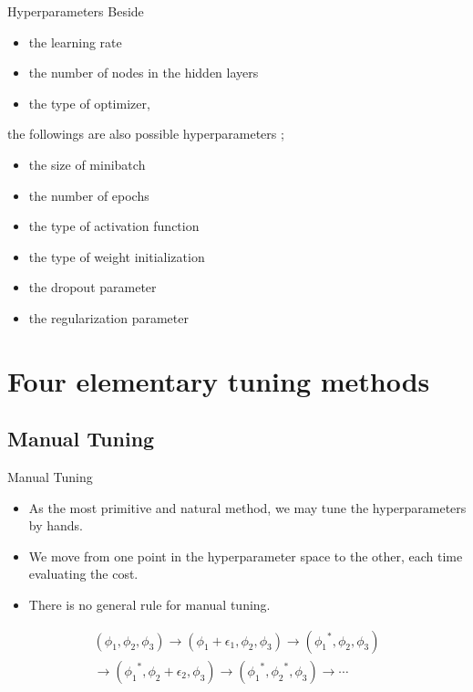 \documentclass{beamer}
\begin{document}
%
\begin{frame}{Hyperparameters}
Beside
\begin{itemize}
\setlength\itemsep{0pt}
\item
the learning rate
\item
the number of nodes in the hidden layers
\item
the type of optimizer,
\end{itemize}
the followings are also possible hyperparameters ; 
\begin{itemize}
\setlength\itemsep{0pt}
\item
the size of minibatch
\item
the number of epochs
\item
the type of activation function
\item
the type of weight initialization
\item
the dropout parameter
\item
the regularization parameter
\end{itemize}
\end{frame}

\section{Four elementary tuning methods}

\subsection{Manual Tuning}

%
\begin{frame}{Manual Tuning}
\begin{itemize}
\item
As the most primitive and natural method, we may tune the hyperparameters by hands.
\item
We move from one point in the hyperparameter space to the other, each time evaluating the cost.
\item
There is no general rule for manual tuning.
\end{itemize}
\begin{multline*}
(\phi_1,\phi_2,\phi_3)
\longrightarrow(\phi_1+\epsilon_1,\phi_2,\phi_3)
\longrightarrow({\phi_1}^*,\phi_2,\phi_3)\\
\longrightarrow({\phi_1}^*,\phi_2+\epsilon_2,\phi_3)
\longrightarrow({\phi_1}^*,{\phi_2}^*,\phi_3)
\longrightarrow\cdots
\end{multline*}
\end{frame}
\end{document}
